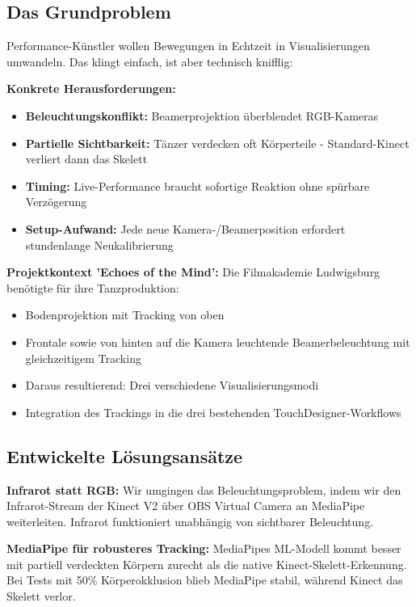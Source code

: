
\subsection{Das Grundproblem}

Performance-Künstler wollen Bewegungen in Echtzeit in Visualisierungen umwandeln. Das klingt einfach, ist aber technisch knifflig: 

\textbf{Konkrete Herausforderungen:}
\begin{itemize}
    \item \textbf{Beleuchtungskonflikt:} Beamerprojektion überblendet RGB-Kameras
    \item \textbf{Partielle Sichtbarkeit:} Tänzer verdecken oft Körperteile - Standard-Kinect verliert dann das Skelett
    \item \textbf{Timing:} Live-Performance braucht sofortige Reaktion ohne spürbare Verzögerung
    \item \textbf{Setup-Aufwand:} Jede neue Kamera-/Beamerposition erfordert stundenlange Neukalibrierung
\end{itemize}



\textbf{Projektkontext 'Echoes of the Mind':}
Die Filmakademie Ludwigsburg benötigte für ihre Tanzproduktion:
\begin{itemize}
    \item Bodenprojektion mit Tracking von oben
    \item Frontale sowie von hinten auf die Kamera leuchtende Beamerbeleuchtung mit gleichzeitigem Tracking
    \item Daraus resultierend: Drei verschiedene Visualisierungsmodi
    \item Integration des Trackings in die drei bestehenden TouchDesigner-Workflows
\end{itemize}

\subsection{Entwickelte Lösungsansätze}

\textbf{Infrarot statt RGB:}
Wir umgingen das Beleuchtungsproblem, indem wir den Infrarot-Stream der Kinect V2 über OBS Virtual Camera an MediaPipe weiterleiten. Infrarot funktioniert unabhängig von sichtbarer Beleuchtung.

\textbf{MediaPipe für robusteres Tracking:}
MediaPipes ML-Modell kommt besser mit partiell verdeckten Körpern zurecht als die native Kinect-Skelett-Erkennung. Bei Tests mit 50\% Körperokklusion blieb MediaPipe stabil, während Kinect das Skelett verlor.

